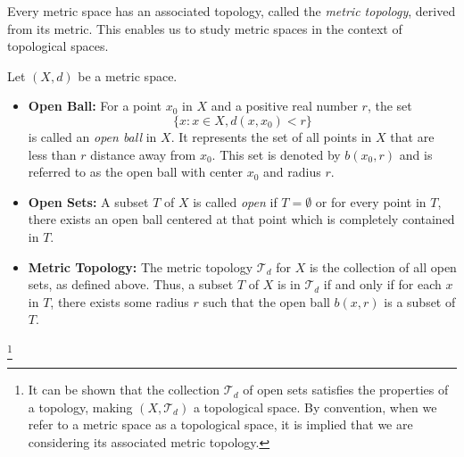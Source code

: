 Every metric space has an associated topology, called the \textit{metric topology}, derived from its metric. This enables us to study metric spaces in the context of topological spaces.
\begin{definition}
    Let \( (X, d) \) be a metric space.
    \begin{itemize}
    \item \textbf{Open Ball:} For a point \( x_0 \) in \( X \) and a positive real number \( r \), the set
    \[
    \{ x : x \in X, d(x, x_0) < r \}
    \]
    is called an \textit{open ball} in \( X \). It represents the set of all points in \( X \) that are less than \( r \) distance away from \( x_0 \). This set is denoted by \( b(x_0, r) \) and is referred to as the open ball with center \( x_0 \) and radius \( r \).
    
    \item \textbf{Open Sets:} A subset \( T \) of \( X \) is called \textit{open} if \( T = \emptyset \) or for every point in \( T \), there exists an open ball centered at that point which is completely contained in \( T \).
    
    \item \textbf{Metric Topology:} The metric topology \( \mathcal{T}_d \) for \( X \) is the collection of all open sets, as defined above. Thus, a subset \( T \) of \( X \) is in \( \mathcal{T}_d \) if and only if for each \( x \) in \( T \), there exists some radius \( r \) such that the open ball \( b(x, r) \) is a subset of \( T \).
    \end{itemize}
    \footnote{It can be shown that the collection \( \mathcal{T}_d \) of open sets satisfies the properties of a topology, making \( (X, \mathcal{T}_d) \) a topological space. By convention, when we refer to a metric space as a topological space, it is implied that we are considering its associated metric topology.}
\end{definition}



    
    


